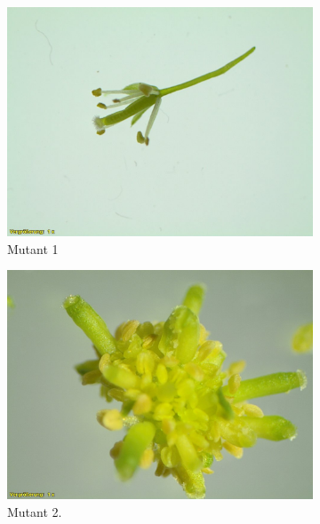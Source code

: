 \documentclass[10pt,a4paper]{article}
\begin{document}
		\begin{figure}[!tbp]
			\centering
			\begin{subfigure}[b]{0.45\textwidth}
				\includegraphics[width=\textwidth]{1_O+A.jpg}
				\caption{Mutant 1}
				\label{fig:f1}
			\end{subfigure}
			\hfill
			\begin{subfigure}[b]{0.45\textwidth}
				\includegraphics[width=\textwidth]{2_O+A(1).jpg}
				\caption{Mutant 2.}
				\label{fig:f2}
			\end{subfigure}
			\hfill
			\begin{subfigure}[b]{0.45\textwidth}

\end{subfigure}
\end{figure}
\end{document}
